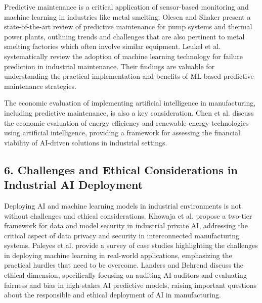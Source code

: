 Predictive maintenance is a critical application of sensor-based monitoring and machine learning in industries like metal smelting. Olesen and Shaker \cite{olesen-2020} present a state-of-the-art review of predictive maintenance for pump systems and thermal power plants, outlining trends and challenges that are also pertinent to metal smelting factories which often involve similar equipment. Leukel et al. \cite{leukel-2021} systematically review the adoption of machine learning technology for failure prediction in industrial maintenance. Their findings are valuable for understanding the practical implementation and benefits of ML-based predictive maintenance strategies.

The economic evaluation of implementing artificial intelligence in manufacturing, including predictive maintenance, is also a key consideration. Chen et al. \cite{chen-2021} discuss the economic evaluation of energy efficiency and renewable energy technologies using artificial intelligence, providing a framework for assessing the financial viability of AI-driven solutions in industrial settings.

\subsection*{6. Challenges and Ethical Considerations in Industrial AI Deployment}

Deploying AI and machine learning models in industrial environments is not without challenges and ethical considerations. Khowaja et al. \cite{khowaja-2022} propose a two-tier framework for data and model security in industrial private AI, addressing the critical aspect of data privacy and security in interconnected manufacturing systems. Paleyes et al. \cite{paleyes-2022} provide a survey of case studies highlighting the challenges in deploying machine learning in real-world applications, emphasizing the practical hurdles that need to be overcome. Landers and Behrend \cite{landers-2022} discuss the ethical dimension, specifically focusing on auditing AI auditors and evaluating fairness and bias in high-stakes AI predictive models, raising important questions about the responsible and ethical deployment of AI in manufacturing.